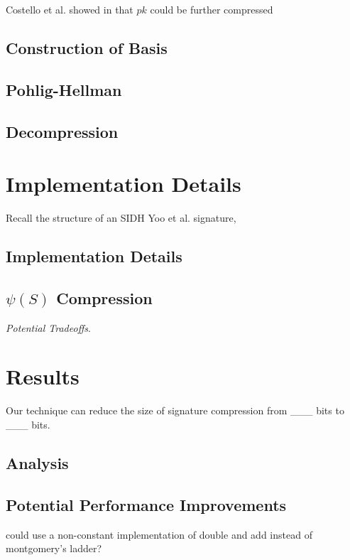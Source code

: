 Costello et al. showed in \cite{pkcomp} that $pk$ could be further compressed  

\subsection{Construction of Basis}

\subsection{Pohlig-Hellman}

\subsection{Decompression}

\section{Implementation Details}
\label{sec:compimplementation}

Recall the structure of an SIDH Yoo et al. signature,

\subsection{Implementation Details}

\subsection{$\psi(S)$ Compression}

\noindent
\textit{Potential Tradeoffs}.

\section{Results}

Our technique can reduce the size of \sidh signature compression from \_\_\_ bits to \_\_\_ bits.

\subsection{Analysis}

\subsection{Potential Performance Improvements}

could use a non-constant implementation of double and add instead of montgomery's ladder? 

